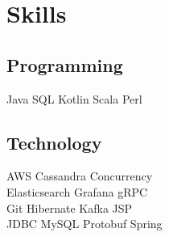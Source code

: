 \section{Skills}
\subsection{Programming}
Java \textbullet{} SQL \textbullet{} Kotlin \textbullet{} Scala \textbullet{} Perl
\sectionsep

\subsection{Technology}
AWS \textbullet{} Cassandra \textbullet{} Concurrency \\
Elasticsearch \textbullet{} Grafana \textbullet{} gRPC \\
Git \textbullet{} Hibernate \textbullet{} Kafka \textbullet{} JSP \\
JDBC \textbullet{} MySQL \textbullet{} Protobuf \textbullet{} Spring \sectionsep
